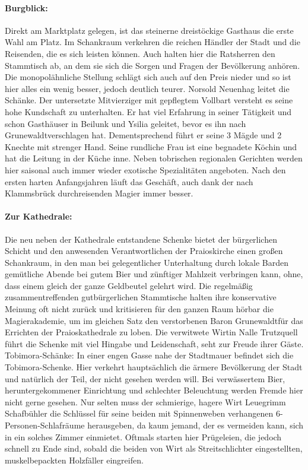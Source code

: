 \paragraph{Burgblick:} Direkt am Marktplatz gelegen, ist das steinerne dreistöckige Gasthaus die erste Wahl am Platz. Im Schankraum verkehren die reichen Händler der Stadt und die Reisenden, die es sich leisten können. Auch halten hier die Ratsherren den Stammtisch ab, an dem sie sich die Sorgen und Fragen der Bevölkerung anhören. Die monopolähnliche Stellung schlägt sich auch auf den Preis nieder und so ist hier alles ein wenig besser, jedoch deutlich teurer. Norsold Neuenhag leitet die Schänke. Der untersetzte Mitvierziger mit gepflegtem Vollbart versteht es seine hohe Kundschaft zu unterhalten. Er hat viel Erfahrung in seiner Tätigkeit und schon Gasthäuser in Beilunk und Ysilia geleitet, bevor es ihn nach Grunewaldtverschlagen hat. Dementsprechend führt er seine 3 Mägde und 2 Knechte mit strenger Hand. Seine rundliche Frau ist eine begnadete Köchin und hat die Leitung in der Küche inne. Neben tobrischen regionalen Gerichten werden hier saisonal auch immer wieder exotische Spezialitäten angeboten. Nach den ersten harten Anfangsjahren läuft das Geschäft, auch dank der nach Klammsbrück durchreisenden Magier immer besser.

\paragraph{Zur Kathedrale:} Die neu neben der Kathedrale entstandene Schenke bietet der bürgerlichen Schicht und den anwesenden Verantwortlichen der Praioskirche einen großen Schankraum, in den man bei gelegentlicher Unterhaltung durch lokale Barden gemütliche Abende bei gutem Bier und zünftiger Mahlzeit verbringen kann, ohne, dass einem gleich der ganze Geldbeutel gelehrt wird. Die regelmäßig zusammentreffenden gutbürgerlichen Stammtische halten ihre konservative Meinung oft nicht zurück und kritisieren für den ganzen Raum hörbar die Magierakademie, um im gleichen Satz den verstorbenen Baron Grunewaldtfür das Errichten der Praioskathedrale zu loben. Die verwitwete Wirtin Nalle Trutzquell führt die Schenke mit viel Hingabe und Leidenschaft, seht zur Freude ihrer Gäste.
Tobimora-Schänke: In einer engen Gasse nahe der Stadtmauer befindet sich die Tobimora-Schenke. Hier verkehrt hauptsächlich die ärmere Bevölkerung der Stadt und natürlich der Teil, der nicht gesehen werden will. Bei verwässertem Bier, heruntergekommener Einrichtung und schlechter Beleuchtung werden Fremde hier nicht gerne gesehen. Nur selten muss der schmierige, hagere Wirt Leuegrimm Schafbühler die Schlüssel für seine beiden mit Spinnenweben verhangenen 6-Personen-Schlafräume herausgeben, da kaum jemand, der es vermeiden kann, sich in ein solches Zimmer einmietet. Oftmals starten hier Prügeleien, die jedoch schnell zu Ende sind, sobald die beiden von Wirt als Streitschlichter eingestellten, muskelbepackten Holzfäller eingreifen. 

